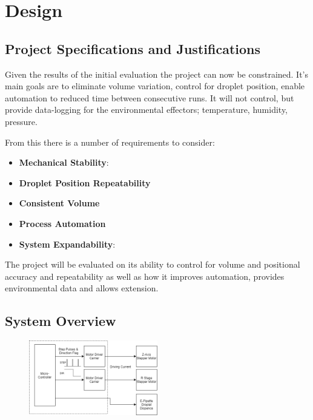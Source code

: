 \chapter{Design}\label{C:des}

\section{Project Specifications and Justifications}
Given the results of the initial evaluation the project can now be constrained. It's main goals are to eliminate volume variation, control for droplet position, enable automation to reduced time between consecutive runs. It will not control, but provide data-logging for the environmental effectors; temperature, humidity, pressure. 

From this there is a number of requirements to consider:

\begin{itemize}
    \item \textbf{Mechanical Stability}:
    \item \textbf{Droplet Position Repeatability}
    \item \textbf{Consistent Volume}
    \item \textbf{Process Automation}
    \item \textbf{System Expandability}:
\end{itemize}

The project will be evaluated on its ability to control for volume and positional accuracy and repeatability as well as how it improves automation, provides environmental data and allows extension.  

\section{System Overview}

\begin{figure}[h]
    \begin{center}
        \includegraphics[width=0.5\textwidth]{img/ED_block_diag.png}
    \end{center}
\end{figure}

